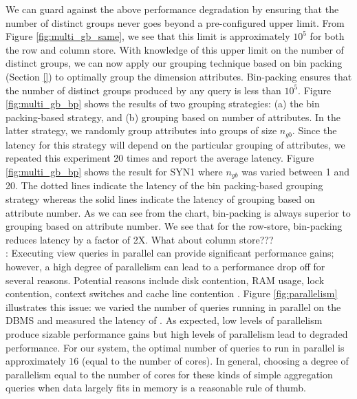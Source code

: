 We can guard against the above performance degradation by ensuring that the
number of distinct groups never goes beyond a pre-configured upper limit.
From Figure \ref{fig:multi_gb_same}, we see that this limit is approximately
$10^5$ for both the row and column store.
With knowledge of this upper limit on the number of distinct groups, we can now
apply our grouping technique based on bin packing (Section \ref{}) to optimally
group the dimension attributes.
Bin-packing ensures that the number of distinct groups produced by any query is
less than $10^5$.
Figure \ref{fig:multi_gb_bp} shows the results of two grouping strategies: (a)
the bin packing-based strategy, and (b) grouping based on number of attributes.
In the latter strategy, we randomly group attributes into groups of size
$n_{gb}$. 
Since the latency for this strategy will depend on the particular grouping of
attributes, we repeated this experiment 20 times and report the average latency.
Figure \ref{fig:multi_gb_bp} shows the result for SYN1 where $n_{gb}$ was varied
between 1 and 20.
The dotted lines indicate the latency of the bin packing-based grouping strategy
whereas the solid lines indicate the latency of grouping based on attribute
number.
As we can see from the chart, bin-packing is always superior to grouping
based on attribute number.
We see that for the row-store, bin-packing reduces latency by a factor of 2X. 
What about column store???\\

: 
Executing view queries in parallel can provide significant performance gains;
however, a high degree of parallelism can lead to a performance drop off for
several reasons. Potential reasons include disk contention, RAM usage, lock
contention, context switches and cache line contention \cite{Postgres_wiki}. 
Figure \ref{fig:parallelism} illustrates this issue: we varied the number of
queries running in parallel on the DBMS and measured the latency of
\VizRecDB.
As expected, low levels of parallelism produce sizable performance gains but
high levels of parallelism lead to degraded performance.
For our system, the optimal number of queries to run in parallel is
approximately $16$ (equal to the number of cores). 
In general, choosing a degree of parallelism equal to the number of cores
for these kinds of simple aggregation queries when data largely fits in memory
is a reasonable rule of thumb.  \\

